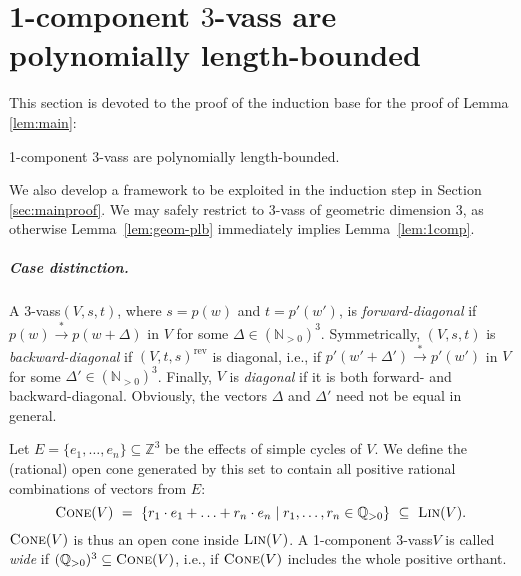 \documentclass[a4paper, UKenglish, cleveref, autoref, thm-restate]{lipics-v2021}
\newcommand{\N}{\mathbb{N}}
\newcommand{\Z}{\mathbb{Z}}
\newcommand{\Q}{\mathbb{Q}}
\newcommand{\Qpos}{\Q_{>0}}
\newcommand{\set}[1]{\{#1\}}
\newcommand{\setof}[2]{\set{#1 \mid #2}}
\newcommand{\trans}[1]{\stackrel{#1}{\longrightarrow}}
\newcommand{\plb}{polynomially length-bounded\xspace}
\newcommand{\Lin}[1]{\textsc{Lin}(#1)}
\newcommand{\vass}{{\sc vass}\xspace}
\newcommand{\tvass}{\parvass 3}
\newcommand{\parvass}[1]{{$#1$-\vass}\xspace}
\newcommand{\para}[1]{\vspace{-3mm}\subparagraph*{\bf #1.}}
\newcommand{\rev}[1]{{#1}^{\text{rev}}}
\newcommand{\cone}[1]{\textsc{Cone}(#1)}
\newcommand{\Npos}{\N_{>0}}
\begin{document}
 

\section{1-component \tvass are \plb} \label{sec:1comp}

This section is devoted to the proof of the 
induction base for the proof of Lemma \ref{lem:main}:

\begin{lemma} \label{lem:1comp}
1-component \tvass are \plb.
\end{lemma}

\noindent
We also develop a framework to be exploited in the induction step in 
Section \ref{sec:mainproof}.
We may safely restrict to \tvass of geometric dimension 3,
as otherwise Lemma~\ref{lem:geom-plb} immediately implies Lemma~\ref{lem:1comp}.

\para{Case distinction}
A \tvass $(V, s, t)$, where $s=p(w)$ and $t=p'(w')$,
is \emph{forward-diagonal} if
$p(w) \trans{*} p(w+\Delta)$ in $V$ for some $\Delta \in (\Npos)^3$.
Symmetrically, $(V, s, t)$ is \emph{backward-diagonal} if $\rev{(V, t, s)}$ is diagonal, i.e., if 
$p'(w'+\Delta') \trans{*} p'(w')$ in $V$ for some $\Delta' \in (\Npos)^3$.
Finally, $V$ is \emph{diagonal} if it is both forward- and backward-diagonal.
Obviously, the vectors $\Delta$ and $\Delta'$ need not be equal in general.



Let  $E=\{e_1, \ldots, e_n\} \subseteq \Z^3$ be the effects of simple cycles of $V$.
We define the (rational) open cone generated by this set
to contain all positive rational combinations of vectors from $E$:
\[
\cone {V} \ = \ \setof{ r_1 \cdot e_1 + \ldots + r_n \cdot e_n }{r_1, \ldots, r_n \in \Qpos} \ \subseteq \ \Lin V.
\]
$\cone V$ is thus an open cone inside $\Lin V$.
A 1-component \tvass $V$ is called \emph{wide} if $(\Qpos)^3 \subseteq \cone V$, i.e.,
if $\cone V$ includes the whole positive orthant.
\end{document}
